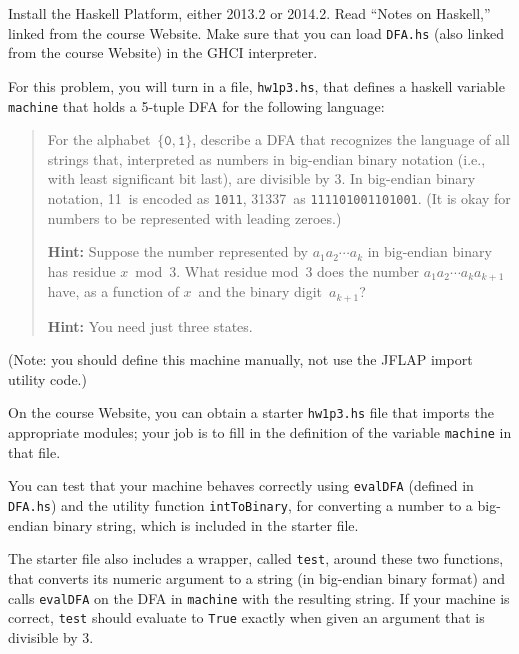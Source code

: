 \documentclass[letterpaper,12pt]{article}
\begin{document}
\begin{description}
  Install the Haskell Platform, either 2013.2 or 2014.2.  Read ``Notes
  on Haskell,'' linked from the course Website.  Make sure that you
  can load \texttt{DFA.hs} (also linked from the course Website) in
  the GHCI interpreter.

  For this problem, you will turn in a file, \texttt{hw1p3.hs}, that
  defines a haskell variable \texttt{machine} that holds a 5-tuple DFA
  for the following language:

  \begin{quotation}
    For the alphabet~$\{\texttt{0},\texttt{1}\}$, describe a DFA that
    recognizes the language of all strings that, interpreted as
    numbers in big-endian binary notation (i.e., with least
    significant bit last), are divisible by 3.  In big-endian binary
    notation, 11~is encoded as \texttt{1011}, 31337~as
    \texttt{111101001101001}.  (It is okay for numbers to be
    represented with leading zeroes.)

    \textbf{Hint:} Suppose the number represented by $a_1 a_2 \cdots
    a_{k}$ in big-endian binary has residue $x$~mod~3.  What residue
    mod~3 does the number $a_1 a_2 \cdots a_{k} a_{k+1}$ have, as a
    function of $x$~and the binary digit~$a_{k+1}$?

    \textbf{Hint:} You need just three states.
  \end{quotation}

  (Note: you should define this machine manually, not use the JFLAP
  import utility code.)

  On the course Website, you can obtain a starter \texttt{hw1p3.hs}
  file that imports the appropriate modules; your job is to fill in
  the definition of the variable \texttt{machine} in that file.

  You can test that your machine behaves correctly using
  \texttt{evalDFA} (defined in \texttt{DFA.hs}) and the utility
  function \texttt{intToBinary}, for converting a number to a
  big-endian binary string, which is included in the starter file.

  The starter file also includes a wrapper, called \texttt{test},
  around these two functions, that converts its numeric argument to a
  string (in big-endian binary format) and calls \texttt{evalDFA} on
  the DFA in \texttt{machine} with the resulting string.  If your
  machine is correct, \texttt{test} should evaluate to \texttt{True}
  exactly when given an argument that is divisible by 3.


\end{description}
\end{document}

